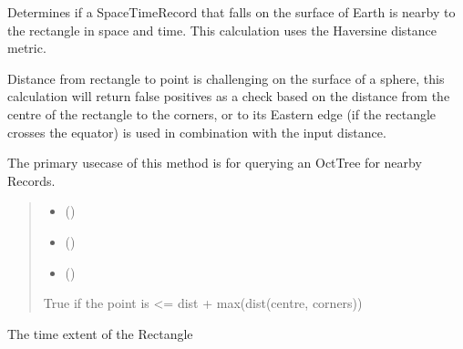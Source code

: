 \documentclass[letterpaper,10pt,english]{sphinxmanual}
\begin{document}
\begin{fulllineitems}
\begin{fulllineitems}
\sphinxAtStartPar
Determines if a SpaceTimeRecord that falls on the surface of Earth is
nearby to the rectangle in space and time. This calculation uses the
Haversine distance metric.

\sphinxAtStartPar
Distance from rectangle to point is challenging on the surface of a
sphere, this calculation will return false positives as a check based
on the distance from the centre of the rectangle to the corners, or
to its Eastern edge (if the rectangle crosses the equator) is used in
combination with the input distance.

\sphinxAtStartPar
The primary use\sphinxhyphen{}case of this method is for querying an OctTree for
nearby Records.
\begin{quote}\begin{description}
\begin{itemize}
\item {} 
\sphinxAtStartPar
{} ({\hyperref[\detokenize{users_guide:GeoSpatialTools.octtree.SpaceTimeRecord}]{}})

\item {} 
\sphinxAtStartPar
{} (\sphinxstyleliteralemphasis{\sphinxupquote{,}})

\item {} 
\sphinxAtStartPar
{} ()

\end{itemize}

\sphinxAtStartPar
{}

\sphinxAtStartPar
True if the point is \textless{}= dist + max(dist(centre, corners))

\end{description}\end{quote}

\end{fulllineitems}


\begin{fulllineitems}
\label{\detokenize{users_guide:GeoSpatialTools.octtree.SpaceTimeRectangle.time_range}}
\pysigstartsignatures
\pysigline
{}
\pysigstopsignatures
\sphinxAtStartPar
The time extent of the Rectangle

\end{fulllineitems}


\end{fulllineitems}
\end{document}
